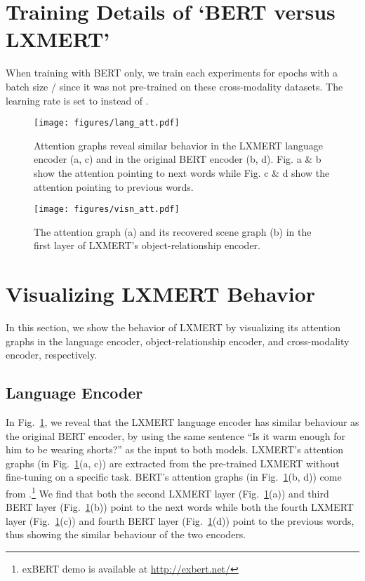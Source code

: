 \documentclass[11pt,a4paper]{article}
\begin{document}
\section{Training Details of `BERT versus LXMERT'}
When training with BERT only, we train each experiments for  epochs with a batch size / since it was not pre-trained on these cross-modality datasets.
The learning rate is set to  instead of .

\begin{figure}[t]
\centering
\texttt{[image: figures/lang\_att.pdf]}
\caption{
Attention graphs reveal similar behavior in the LXMERT language encoder (a, c) and in the original BERT encoder (b, d). Fig. a \& b show the attention pointing to next words while Fig. c \& d show the attention pointing to previous words.
}
\vspace{0pt}
\label{fig:lang_att}
\end{figure}

\begin{figure}[t]
\centering
\texttt{[image: figures/visn\_att.pdf]}
\caption{
The attention graph (a) and its recovered scene graph (b) in the first layer of LXMERT's object-relationship encoder.
}
\vspace{0pt}
\label{fig:visn_att}
\end{figure}


\section{Visualizing LXMERT Behavior}
In this section, we show the behavior of LXMERT by visualizing its attention graphs in the {language encoder}, {object-relationship encoder}, and {cross-modality encoder}, respectively.
\subsection{Language Encoder}
In Fig.~\ref{fig:lang_att}, we reveal that the LXMERT language encoder has similar behaviour as the original BERT encoder, by using the same sentence ``Is it warm enough for him to be wearing shorts?'' as the input to both models.
LXMERT's attention graphs (in Fig.~\ref{fig:lang_att}(a, c)) are extracted from the pre-trained LXMERT without fine-tuning on a specific task.
BERT's attention graphs (in Fig.~\ref{fig:lang_att}(b, d)) come from .\footnote{exBERT demo \cite{hoover2019exbert} is available at \url{http://exbert.net/}}
We find that both the second LXMERT layer (Fig.~\ref{fig:lang_att}(a)) and third BERT layer (Fig.~\ref{fig:lang_att}(b)) point to the next words while both the fourth LXMERT layer (Fig.~\ref{fig:lang_att}(c)) and fourth BERT layer (Fig.~\ref{fig:lang_att}(d)) point to the previous words, thus showing the similar behaviour of the two encoders.
\end{document}
